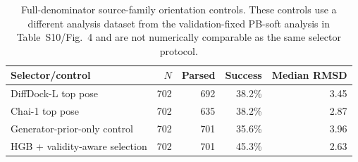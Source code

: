 \begin{table}[!ht]
\centering
\caption{Full-denominator source-family orientation controls. These controls use a different analysis dataset from the validation-fixed PB-soft analysis in Table~S10/Fig.~4 and are not numerically comparable as the same selector protocol.}
\label{tab:s_selector_controls}
\small
\begin{tabular}{lrrrr}
\toprule
Selector/control & $N$ & Parsed & Success & Median RMSD \\
\midrule
DiffDock-L top pose & 702 & 692 & 38.2\% & 3.45 \\
Chai-1 top pose & 702 & 635 & 38.2\% & 2.87 \\
Generator-prior-only control & 702 & 701 & 35.6\% & 3.96 \\
HGB + validity-aware selection & 702 & 701 & 45.3\% & 2.63 \\
\bottomrule
\end{tabular}
\end{table}

